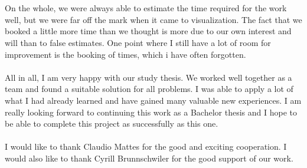 \\\\
On the whole, we were always able to estimate the time required for the work well, but we were far off the mark when it came to visualization. The fact that we booked a little more time than we thought is more due to our own interest and will than to false estimates. One point where I still have a lot of room for improvement is the booking of times, which i have often forgotten.
\\\\
All in all, I am very happy with our study thesis. We worked well together as a team and found a suitable solution for all problems. I was able to apply a lot of what I had already learned and have gained many valuable new experiences. I am really looking forward to continuing this work as a Bachelor thesis and I hope to be able to complete this project as successfully as this one.
\\\\
I would like to thank Claudio Mattes for the good and exciting cooperation. I would also like to thank Cyrill Brunnschwiler for the good support of our work.
